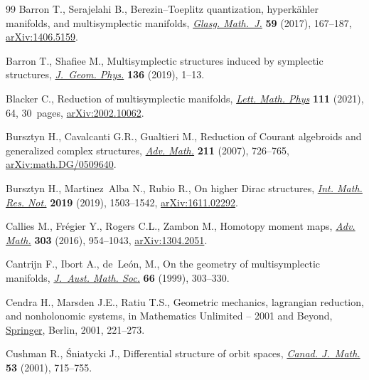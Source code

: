 \begin{thebibliography}{99}
Barron T., Serajelahi B., Berezin--{T}oeplitz quantization, hyperk\"ahler
  manifolds, and multisymplectic manifolds, \href{https://doi.org/10.1017/S0017089516000100}{\textit{Glasg. Math.~J.}}
  \textbf{59} (2017), 167--187, \href{https://arxiv.org/abs/1406.5159}{arXiv:1406.5159}.

Barron T., Shafiee M., Multisymplectic structures induced by symplectic
  structures, \href{https://doi.org/10.1016/j.geomphys.2018.10.008}{\textit{J.~Geom. Phys.}} \textbf{136} (2019), 1--13.

Blacker C., Reduction of multisymplectic manifolds, \href{https://doi.org/10.1007/s11005-021-01408-y}{\textit{Lett. Math. Phys}}
  \textbf{111} (2021), 64, 30~pages, \href{https://arxiv.org/abs/2002.10062}{arXiv:2002.10062}.

Bursztyn H., Cavalcanti G.R., Gualtieri M., Reduction of {C}ourant algebroids
  and generalized complex structures, \href{https://doi.org/10.1016/j.aim.2006.09.008}{\textit{Adv. Math.}} \textbf{211} (2007),
  726--765, \href{https://arxiv.org/abs/math.DG/0509640}{arXiv:math.DG/0509640}.

Bursztyn H., Martinez~Alba N., Rubio R., On higher {D}irac structures,
  \href{https://doi.org/10.1093/imrn/rnx163}{\textit{Int. Math. Res. Not.}} \textbf{2019} (2019), 1503--1542,
  \href{https://arxiv.org/abs/1611.02292}{arXiv:1611.02292}.

Callies M., Fr\'egier Y., Rogers C.L., Zambon M., Homotopy moment maps,
  \href{https://doi.org/10.1016/j.aim.2016.08.012}{\textit{Adv. Math.}} \textbf{303} (2016), 954--1043, \href{https://arxiv.org/abs/1304.2051}{arXiv:1304.2051}.

Cantrijn F., Ibort A., de~Le\'on, M., On the geometry of multisymplectic
  manifolds, \href{https://doi.org/10.1017/S1446788700036636}{\textit{J.~Aust. Math. Soc.}} \textbf{66} (1999), 303--330.

Cendra H., Marsden J.E., Ratiu T.S., Geometric mechanics, lagrangian reduction,
  and nonholonomic systems, in Mathematics Unlimited -- 2001 and Beyond,
  \href{https://doi.org/10.1007/978-3-642-56478-9_10}{Springer}, Berlin, 2001, 221--273.

Cushman R., \'Sniatycki J., Differential structure of orbit spaces,
  \href{https://doi.org/10.4153/CJM-2001-029-1}{\textit{Canad. J.~Math.}} \textbf{53} (2001), 715--755.


\end{thebibliography}
